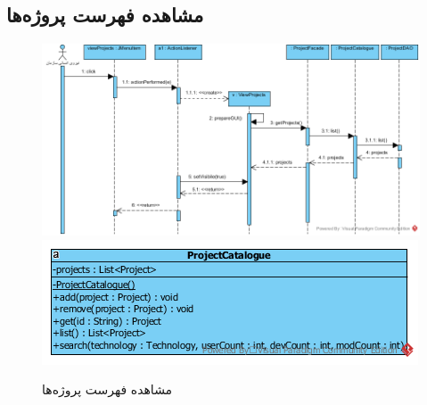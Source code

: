 \begin{landscape}
\section{مشاهده فهرست پروژه‌ها}
\begin{figure}[H]
	\centering
	\includegraphics[scale=0.8]{img/sequence-design/ViewListOfProjects}
	\includegraphics[scale=0.9]{img/sequence-design/ViewListOfProjectsC}
	\caption{مشاهده فهرست پروژه‌ها}
\end{figure}

\newpage

\end{landscape}
